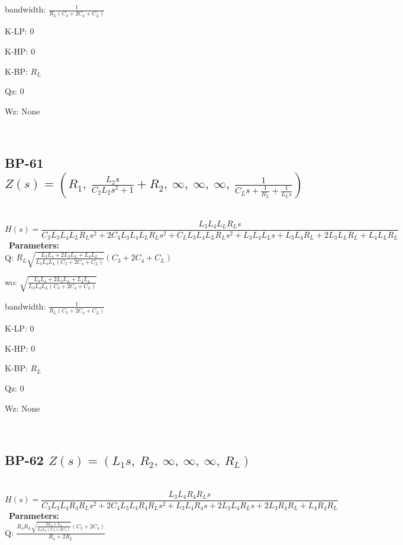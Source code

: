 \documentclass{article}
\begin{document}
bandwidth: $\frac{1}{R_{L} \left(C_{3} + 2 C_{4} + C_{L}\right)}$\ 

K-LP: $0$\ 

K-HP: $0$\ 

K-BP: $R_{L}$\ 

Qz: $0$\ 

Wz: $\text{None}$\ 

\ 

\subsection{BP-61 $Z(s) = \left( R_{1}, \  \frac{L_{2} s}{C_{2} L_{2} s^{2} + 1} + R_{2}, \  \infty, \  \infty, \  \infty, \  \frac{1}{C_{L} s + \frac{1}{R_{L}} + \frac{1}{L_{L} s}}\right)$ } \ 
\textbf{\[H(s) = \frac{L_{3} L_{4} L_{L} R_{L} s}{C_{3} L_{3} L_{4} L_{L} R_{L} s^{2} + 2 C_{4} L_{3} L_{4} L_{L} R_{L} s^{2} + C_{L} L_{3} L_{4} L_{L} R_{L} s^{2} + L_{3} L_{4} L_{L} s + L_{3} L_{4} R_{L} + 2 L_{3} L_{L} R_{L} + L_{4} L_{L} R_{L}}\] } \ 
\textbf{Parameters:}\\ 

Q: $R_{L} \sqrt{\frac{L_{3} L_{4} + 2 L_{3} L_{L} + L_{4} L_{L}}{L_{3} L_{4} L_{L} \left(C_{3} + 2 C_{4} + C_{L}\right)}} \left(C_{3} + 2 C_{4} + C_{L}\right)$\ 

wo: $\sqrt{\frac{L_{3} L_{4} + 2 L_{3} L_{L} + L_{4} L_{L}}{L_{3} L_{4} L_{L} \left(C_{3} + 2 C_{4} + C_{L}\right)}}$\ 

bandwidth: $\frac{1}{R_{L} \left(C_{3} + 2 C_{4} + C_{L}\right)}$\ 

K-LP: $0$\ 

K-HP: $0$\ 

K-BP: $R_{L}$\ 

Qz: $0$\ 

Wz: $\text{None}$\ 

\ 

\subsection{BP-62 $Z(s) = \left( L_{1} s, \  R_{2}, \  \infty, \  \infty, \  \infty, \  R_{L}\right)$ } \ 
\textbf{\[H(s) = \frac{L_{3} L_{4} R_{4} R_{L} s}{C_{3} L_{3} L_{4} R_{4} R_{L} s^{2} + 2 C_{4} L_{3} L_{4} R_{4} R_{L} s^{2} + L_{3} L_{4} R_{4} s + 2 L_{3} L_{4} R_{L} s + 2 L_{3} R_{4} R_{L} + L_{4} R_{4} R_{L}}\] } \ 
\textbf{Parameters:}\\ 

Q: $\frac{R_{4} R_{L} \sqrt{\frac{2 L_{3} + L_{4}}{L_{3} L_{4} \left(C_{3} + 2 C_{4}\right)}} \left(C_{3} + 2 C_{4}\right)}{R_{4} + 2 R_{L}}$\ 
\end{document}
